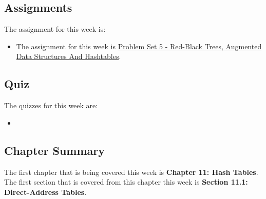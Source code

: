 \subsection{Assignments}

The assignment for this week is:

\begin{itemize}
    \item The assignment for this week is \href{https://github.com/QuantumCompiler/CU/tree/main/CSPB%203104%20-%20Algorithms/CSPB%203104%20-%20Assignments/CSPB%203104%20-%20Problem%20Sets/CSPB%203104%20-%20Problem%20Set%205%20-%20Red-Black%20Trees%2C%20Augmented%20Data%20Structures%20And%20Hashtables}{Problem Set 5 - Red-Black Trees, Augmented Data Structures And Hashtables}. 
\end{itemize}

\subsection{Quiz}

The quizzes for this week are:

\begin{itemize}
    \item {} \textbullet {} 
\end{itemize}

\subsection{Chapter Summary}

The first chapter that is being covered this week is \textbf{Chapter 11: Hash Tables}. The first section that is covered from this chapter this week is \textbf{Section 11.1: Direct-Address Tables}.

